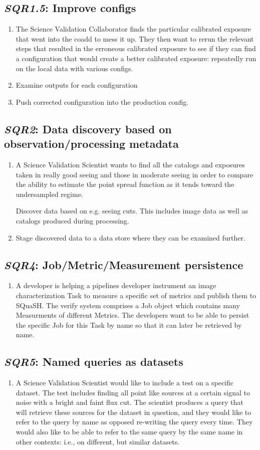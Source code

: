 \documentclass[DM,toc,lsstdraft]{lsstdoc}
\newcommand{\usecase}[3]{%
\subsection{\emph{#1}: #2}
\label{use:#1}
\begin{enumerate}[label=\alph*.]
#3
\end{enumerate}
}
\begin{document}
\usecase{SQR1.5}{Improve configs}{%

\item
The Science Validation Collaborator finds the particular calibrated exposure that went into the coadd to mess it up.
They then want to rerun the relevant steps that resulted in the erroneous calibrated exposure to see if they can find a configuration that would create a better calibrated exposure: repeatedly run on the local data with various configs.

\item
Examine outputs for each configuration

\item
Push corrected configuration into the production config.

}

\usecase{SQR2}{Data discovery based on observation/processing metadata}{%

\item
A Science Validation Scientist wants to find all the catalogs and exposures taken in really good seeing and those in moderate seeing in order to compare the ability to estimate the point spread function as it tends toward the undersampled regime.

Discover data based on e.g. seeing cuts.
This includes image data as well as catalogs produced during processing.

\item
Stage discovered data to a data store where they can be examined further.

}

\usecase{SQR4}{Job/Metric/Measurement persistence}{%

\item
A developer is helping a pipelines developer instrument an image characterization Task to measure a specific set of metrics and publish them to SQuaSH.
The verify system comprises a Job object which contains many Measurments of different Metrics.
The developers want to be able to persist the specific Job for this Task by name so that it can later be retrieved by name.

}

\usecase{SQR5}{Named queries as datasets}{%

\item
A Science Validation Scientist would like to include a test on a specific dataset.
The test includes finding all point like sources at a certain signal to noise with a bright and faint flux cut.
The scientist produces a query that will retrieve these sources for the dataset in question, and they would like to refer to the query by name as opposed re-writing the query every time.
They would also like to be able to refer to the same query by the same name in other contexts: i.e., on different, but similar datasets.

}
\end{document}
